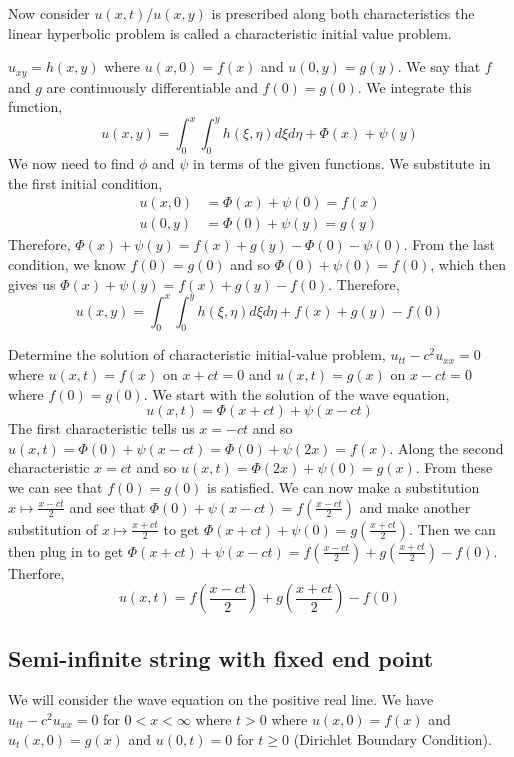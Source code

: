 

\noindent
Now consider $u(x, t)$/$u(x, y)$ is prescribed along both characteristics the linear hyperbolic problem is called a characteristic initial value problem.

\begin{eg}
  $u_{xy} = h(x, y)$ where $u(x, 0) = f(x)$ and $u(0, y) = g(y)$. We say that $f$ and $g$ are continuously differentiable and $f(0) = g(0)$. We integrate this function,
  $$ u(x, y) = \int_0^x\int_0^y h(\xi, \eta) d\xi d\eta + \Phi(x) + \psi(y) $$
  We now need to find $\phi$ and $\psi$ in terms of the given functions. We substitute in the first initial condition,
  \begin{align*}
    u(x, 0) &= \Phi(x) + \psi(0) = f(x) \\
    u(0, y) &= \Phi(0) + \psi(y) = g(y)
  \end{align*}
  Therefore, $\Phi(x) + \psi(y) = f(x) + g(y) - \Phi(0) - \psi(0)$. From the last condition, we know $f(0) = g(0)$ and so $\Phi(0) + \psi(0) = f(0)$, which then gives us $\Phi(x) + \psi(y) = f(x) + g(y) - f(0)$. Therefore,
  $$ u(x, y) = \int_0^x\int_0^y h(\xi, \eta) d\xi d\eta + f(x) + g(y) - f(0) $$
\end{eg}

\begin{eg}
  Determine the solution of characteristic initial-value problem, $u_{tt} - c^2u_{xx} = 0$ where $u(x, t) = f(x)$ on $x + ct = 0$ and $u(x, t) = g(x)$ on $x - ct = 0$ where $f(0) = g(0)$. We start with the solution of the wave equation,
  $$ u(x, t) = \Phi(x + ct) + \psi(x - ct) $$
  The first characteristic tells us $x = -ct$ and so $u(x, t) = \Phi(0) + \psi(x - ct) = \Phi(0) + \psi(2x) = f(x)$. Along the second characteristic $x = ct$ and so $u(x, t) = \Phi(2x) + \psi(0) = g(x)$. From these we can see that $f(0) = g(0)$ is satisfied. We can now make a substitution $x \mapsto \frac{x - ct}{2}$ and see that $\Phi(0) + \psi(x - ct) = f\left(\frac{x - ct}{2}\right)$ and make another substitution of $x \mapsto \frac{x + ct}{2}$ to get $\Phi(x + ct) + \psi(0) = g\left( \frac{x + ct}{2} \right)$.
  Then we can then plug in to get $\Phi(x + ct) + \psi(x - ct) = f\left(\frac{x - ct}{2}\right) + g\left(\frac{x + ct}{2}\right) - f(0)$. Therfore,
  $$ u(x, t) = f\left( \frac{x -ct}{2} \right) + g\left( \frac{x + ct}{2}\right) - f(0) $$
\end{eg}

\subsection{Semi-infinite string with fixed end point}
We will consider the wave equation on the positive real line. We have $u_{tt} - c^2u_{xx} = 0$ for $0 < x < \infty$ where $t > 0$ where $u(x, 0) = f(x)$ and $u_t(x, 0) = g(x)$ and $u(0, t) = 0$ for $t \ge 0$ (Dirichlet Boundary Condition).

